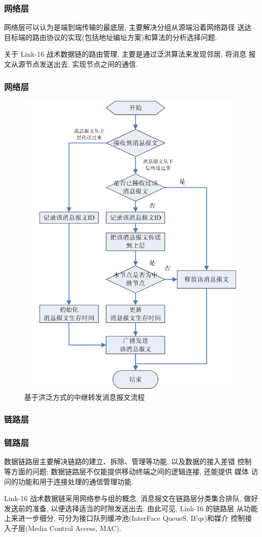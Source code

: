 \documentclass[10pt,mathserif]{beamer}%
\begin{document}
\begin{frame}[fragile]
	\frametitle{网络层}
	\setlength{\parindent}{2em}
	\begin{spacing}{1.5}
		网络层可以认为是端到端传输的最底层, 主要解决分组从源端沿着网络路径 送达
		目标端的路由协议的实现(包括地址编址方案)和算法的分析选择问题. 

		关于 Link-16 战术数据链的路由管理, 主要是通过泛洪算法来发现邻居, 将消息
		报文从源节点发送出去, 实现节点之间的通信. 
	\end{spacing}
\end{frame}

\begin{frame}[fragile]
	\frametitle{网络层}
	\setlength{\parindent}{2em}
	\begin{spacing}{1.5}
		\begin{figure}[htb]
			\centering
			\includegraphics[width=0.6\linewidth]{./images/flood.png}
			\caption{基于洪泛方式的中继转发消息报文流程}
			\label{Fig:flood}
		\end{figure}
	\end{spacing}
\end{frame}

\subsubsection{链路层}

\begin{frame}[fragile]
	\frametitle{链路层}
	\setlength{\parindent}{2em}
	\begin{spacing}{1.5}
		数据链路层主要解决链路的建立、拆除、管理等功能, 以及数据的接入差错 控制
		等方面的问题; 数据链路层不仅能提供移动终端之间的逻辑连接, 还能提供 媒体
		访问的功能和用于连接处理的通信管理功能. 

		Link-16 战术数据链采用网络参与组的概念, 消息报文在链路层分类集合排队,
		做好发送前的准备, 以便选择适当的时隙发送出去. 由此可见, Link-16 的链路层
		从功能上来进一步细分, 可分为接口队列缓冲池(InterFace QueueS, IFqs)和媒介
		控制接入子层(Media Control Access, MAC). 
	\end{spacing}
\end{frame}
\end{document}

